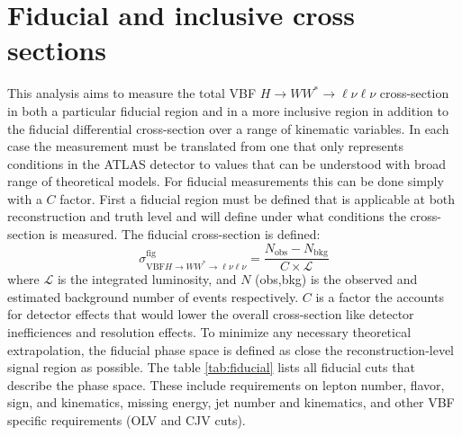\section{Fiducial and inclusive cross sections}
This analysis aims to measure the total VBF $H\rightarrow WW^*\rightarrow\ell\nu\ell\nu$ cross-section in both a particular fiducial region and in a more inclusive region in addition to the fiducial differential cross-section over a range of kinematic variables. In each case the measurement must be translated from one that only represents conditions in the ATLAS detector to values that can be understood with broad range of theoretical models. For fiducial measurements this can be done simply with a $C$ factor. First a fiducial region must be defined that is applicable at both reconstruction and truth level and will define under what conditions the cross-section is measured. The fiducial cross-section is defined:
\begin{equation}
\sigma_{\text{VBF}H\rightarrow WW^*\rightarrow\ell\nu\ell\nu}^{\text{fig}} = \frac{N_{\text{obs}}-N_{\text{bkg}}}{C\times\mathcal{L}}
\end{equation} 
where $\mathcal{L}$ is the integrated luminosity, and $N$ (obs,bkg) is the observed and estimated background number of events respectively. $C$ is a factor the accounts for detector effects that would lower the overall cross-section like detector inefficiences and resolution effects. To minimize any necessary theoretical extrapolation, the fiducial phase space is defined as close the reconstruction-level signal region as possible. The table \ref{tab:fiducial} lists all fiducial cuts that describe the phase space. These include requirements on lepton number, flavor, sign, and kinematics, missing energy, jet number and kinematics, and other VBF specific requirements (OLV and CJV cuts). 
